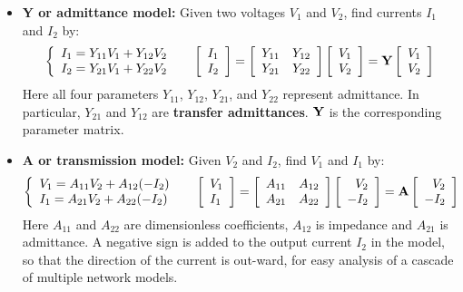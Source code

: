 \begin{itemize}
\begin{itemize}
\item {\bf Y or admittance model:} Given two voltages $V_1$ and $V_2$,
  find currents $I_1$ and $I_2$ by:
  \[ \left\{ \begin{array}{l} I_1=Y_{11}V_1+Y_{12}V_2 \\
    I_2=Y_{21}V_1+Y_{22}V_2 \end{array} \right.\;\;\;\;\;
  \left[ \begin{array}{l} I_1 \\ I_2\end{array} \right]=
  \left[ \begin{array}{ll} Y_{11} & Y_{12}\\Y_{21} & Y_{22}\end{array}\right]
  \left[ \begin{array}{l} V_1 \\ V_2\end{array} \right]
  ={\bf Y}\left[ \begin{array}{l} V_1 \\ V_2\end{array} \right]  \]
  Here all four parameters $Y_{11}$, $Y_{12}$, $Y_{21}$, and $Y_{22}$ represent
  admittance. In particular, $Y_{21}$ and $Y_{12}$ are {\bf transfer admittances}. 
  ${\bf Y}$ is the corresponding parameter matrix.

\item {\bf A or transmission model:} Given $V_2$ and $I_2$, find 
  $V_1$ and $I_1$ by:
  \[\left\{ \begin{array}{l} 
    V_1=A_{11}V_2+A_{12}(-I_2) \\
    I_1=A_{21}V_2+A_{22}(-I_2) \end{array} \right.\;\;\;\;\;
  \left[ \begin{array}{l} V_1 \\ I_1\end{array} \right]=
  \left[ \begin{array}{ll} A_{11} & A_{12}\\A_{21} & A_{22}\end{array}\right]
  \left[ \begin{array}{r} V_2 \\ -I_2\end{array} \right]
  ={\bf A}\left[ \begin{array}{r} V_2 \\ -I_2\end{array} \right]  \]
  Here $A_{11}$ and $A_{22}$ are dimensionless coefficients, $A_{12}$ is impedance 
  and $A_{21}$ is admittance. A negative sign is added to the output current $I_2$ 
  in the model, so that the direction of the current is out-ward, for easy
  analysis of a cascade of multiple network models.


\end{itemize}
\end{itemize}
